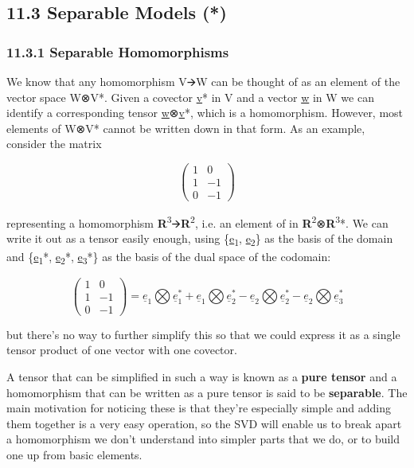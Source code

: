 \documentclass[oneside,english]{amsbook}
\numberwithin{section}{chapter}
\theoremstyle{plain}
\theoremstyle{definition}
\begin{document}
\subsection{11.3 Separable Models (*)}\label{separable-models}

\subsubsection{11.3.1 Separable
	Homomorphisms}\label{separable-homomorphisms}

We know that any homomorphism V🡪W can be thought of as an element of the
vector space W⊗V*. Given a covector \ul{v}* in V and a vector \ul{w} in
W we can identify a corresponding tensor \ul{w}⊗\ul{v}*, which is a
homomorphism. However, most elements of W⊗V* cannot be written down in
that form. As an example, consider the matrix

\[\begin{pmatrix}
	1 & 0 \\
	1 & - 1 \\
	0 & - 1
\end{pmatrix}\]

representing a homomorphism
\textbf{R}\textsuperscript{3}🡪\textbf{R}\textsuperscript{2}, i.e. an
element of in
\textbf{R}\textsuperscript{2}⊗\textbf{R}\textsuperscript{3}*. We can
write it out as a tensor easily enough, using \{\ul{e}\textsubscript{1},
\ul{e}\textsubscript{2}\} as the basis of the domain and
\{\ul{e}\textsubscript{1}*, \ul{e}\textsubscript{2}*,
\ul{e}\textsubscript{3}*\} as the basis of the dual space of the
codomain:

\[\begin{pmatrix}
	1 & 0 \\
	1 & - 1 \\
	0 & - 1
\end{pmatrix} = {\underline{e}}_{1}\bigotimes{\underline{e}}_{1}^{*} + {\underline{e}}_{1}\bigotimes{\underline{e}}_{2}^{*} - {\underline{e}}_{2}\bigotimes{\underline{e}}_{2}^{*} - {\underline{e}}_{2}\bigotimes{\underline{e}}_{3}^{*}\]

but there's no way to further simplify this so that we could express it
as a single tensor product of one vector with one covector.

A tensor that can be simplified in such a way is known as a \textbf{pure
	tensor} and a homomorphism that can be written as a pure tensor is said
to be \textbf{separable}. The main motivation for noticing these is that
they're especially simple and adding them together is a very easy
operation, so the SVD will enable us to break apart a homomorphism we
don't understand into simpler parts that we do, or to build one up from
basic elements.
\end{document}
